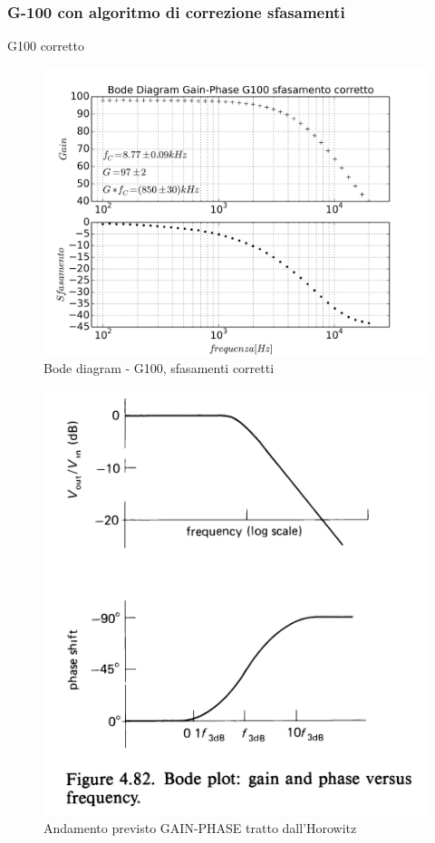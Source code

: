 \documentclass{beamer}
\begin{document}
\subsubsection{G-100 con algoritmo di correzione sfasamenti}

\begin{frame}{G100 corretto}
\begin{figure}
\centering
\includegraphics[width=0.8\linewidth]{./es_8_bode_diag_sfasacorr}
\caption{Bode diagram - G100, sfasamenti corretti}
\label{fig:es_8_bode_diag_sfasacorr}
\end{figure}

\end{frame}

\begin{frame}
\begin{figure}
\centering
\includegraphics[width=0.6\linewidth]{./horowitz_bode}
\caption{Andamento previsto GAIN-PHASE tratto dall'Horowitz}
\label{fig:horowitz_bode}
\end{figure}

\end{frame}
\end{document}
